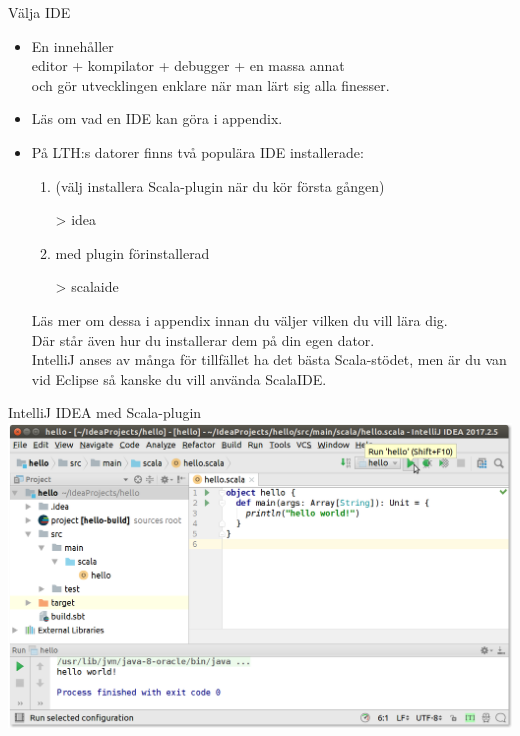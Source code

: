 

\begin{Slide}{Välja IDE}\SlideFontSmall
\begin{itemize}
\item En   innehåller \\ editor + kompilator + debugger + en massa annat\\och gör utvecklingen enklare när man lärt sig alla finesser.

\item Läs om vad en IDE kan göra i appendix.

\pause

\item På LTH:s datorer finns två populära IDE installerade:
\begin{enumerate}\SlideFontSmall

\item {} (välj installera Scala-plugin när du kör första gången)
\begin{REPL}[numbers=none]
> idea
\end{REPL}

\item {} med plugin  förinstallerad
\begin{REPL}[numbers=none]
> scalaide
\end{REPL}

\end{enumerate}
Läs mer om dessa i appendix innan du väljer vilken du vill lära dig.
\\Där står även hur du installerar dem på din egen dator.
\\IntelliJ anses av många för tillfället ha det bästa Scala-stödet, men är du van vid Eclipse så kanske du vill använda ScalaIDE.
\end{itemize}
\end{Slide}

\begin{Slide}{IntelliJ IDEA med Scala-plugin}
\includegraphics[width=\textwidth]{../img/intellij/idea-hello.png}
\end{Slide}

